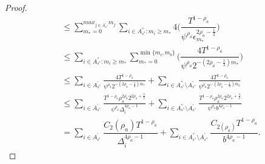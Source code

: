 \begin{proof}
\begin{align*}
&\leq\sum_{m_{*}=0}^{max_{j\in A^{'}_{s^{*}}}m_{j}}\sum_{i\in A^{''}_{s^{*}}:m_{i} \geq m_{*}}4\bigg(\dfrac{T^{1-\rho_{a}}}{\psi^{\rho_{a}}\epsilon_{m_{*}}^{2\rho_{a}-\frac{1}{2}}} \bigg)\\
&\leq\sum_{i\in A^{''}_{s^{*}}:m_{i} \geq m_{*}}\sum_{m_{*}=0}^{\min{\lbrace m_{i},m_{b}\rbrace}}\bigg(\dfrac{4T^{1-\rho_{a}}}{\psi^{\rho_{a}}2^{-(2\rho_{a}-\frac{1}{2})m_{*}}} \bigg)\\
&\!\leq\!\!\sum_{i\in A^{'}_{s^{*}}}\frac{4T^{1-\rho_{a}}}{\psi^{\rho_{a}}2^{-(2\rho_{a}-\frac{1}{2})m_{*}}}\! +\!\!\!\sum_{i\in A^{''}_{s^{*}}\setminus A^{'}_{s^{*}}}\!\frac{4T^{1-\rho_{a}}}{\psi^{\rho_{a}}2^{-(2\rho_{a}-\frac{1}{2})m_{b}}} \\
&\!\leq\!\!\sum_{i\in A^{'}_{s^{*}}}\frac{T^{1-\rho_{a}}\rho_{a}^{2\rho_{a}}2^{2\rho_{a}+\frac{3}{2}}}{\psi^{\rho_{a}}\Delta_{i}^{4\rho_{a}-1}} \!+\!\!\!\sum_{i\in A^{''}_{s^{*}}\setminus A^{'}_{s^{*}}}\!\!\frac{T^{1-\rho_{a}}\rho_{a}^{2\rho_{a}}2^{2\rho_{a}+\frac{3}{2}}}{\psi^{\rho_{a}}b^{4\rho_{a}-1}} \\
& = \sum_{i\in A^{'}_{s^{*}}}\dfrac{ C_{2}(\rho_{a}) T^{1-\rho_{a}}}{\Delta_{i}^{4\rho_{a}-1}} +\sum_{i\in A^{''}_{s^{*}}\setminus A^{'}_{s^{*}}}\dfrac{C_{2(\rho_{a})}T^{1-\rho_{a}}}{b^{4\rho_{a}-1}}.
\end{align*}





\end{proof}

